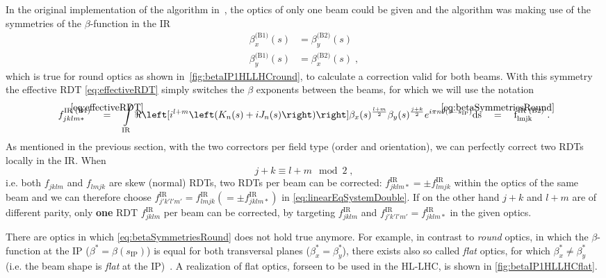 In the original implementation of the algorithm in~\cite{BruningDynamicApertureStudies2004},
the optics of only one beam could be given and the algorithm was making use 
of the symmetries of the $\beta$-function in the IR
%
\begin{equation}
    \label{eq:betaSymmetriesRound}
    \begin{split}
        \beta_x^{\text{(B1)}}(s) &= \beta_y^{\text{(B2)}}(s) \\ 
        \beta_y^{\text{(B1)}}(s) &= \beta_x^{\text{(B2)}}(s) \;, 
    \end{split}
\end{equation}
%
which is true for round optics as shown in~\cref{fig:betaIP1HLLHCround}, to calculate a correction valid for both beams.
With this symmetry the effective RDT \cref{eq:effectiveRDT} simply switches the $\beta$ exponents between the beams, 
for which we will use the notation
%
\begin{equation}
    \label{eq:effectiveRDT*}
    f^\text{IR (B1)}_{jklm*}  
    \quad \overeq{\cref{eq:effectiveRDT}} \quad
    \int\limits_\text{IR} 
    \ReOf{ 
     i^{l+m}
     \left(K_{n}(s) + iJ_{n}(s) \right) 
    }
        \beta_x(s)^{\frac{l+m}{2}}
        \beta_y(s)^{\frac{j+k}{2}} 
     e^{i \pi n \theta(s - s_\text{IP})}
    \rm{d}s 
    \quad \overeq{\cref{eq:betaSymmetriesRound}} \quad
    f^\text{IR (B2)}_{lmjk}\; .
\end{equation}
%
As mentioned in the previous section, with the two correctors per field type (order and orientation),
we can perfectly correct two RDTs locally in the IR. 
When 
%
\begin{equation}
    j+k \equiv l+m \mod{2} \;,
\end{equation}
%
i.e. both $f_{jklm}$ and $f_{lmjk}$ are skew (normal) RDTs, 
two RDTs per beam can be corrected: 
$f^\text{IR}_{jklm*} = \pm f^\text{IR}_{lmjk}$ within the optics of the same beam
and we can therefore choose $f^\text{IR}_{j'k'l'm'}  = f^\text{IR}_{lmjk} (= \pm f^\text{IR}_{jklm*})$ in \cref{eq:linearEqSystemDouble}.
If on the other hand $j+k$ and $l+m$ are of different parity, only \textbf{one} RDT $f^\text{IR}_{jklm}$ per beam can be corrected, 
by targeting $f^\text{IR}_{jklm}$ and $f^\text{IR}_{j'k'l'm'} = f^\text{IR}_{jklm*}$ in the given optics.

There are optics in which \cref{eq:betaSymmetriesRound} does not hold true anymore.
For example, in contrast to \textit{round} optics, 
in which the $\beta$-function  at the IP ($\beta^* = \beta(s_\text{IP})$) is equal for both transversal planes ($\beta^*_x = \beta^*_y$),
there exists also so called \textit{flat} optics, for which $\beta^*_x \neq \beta^*_y$ 
(i.e. the beam shape is \textit{flat} at the IP)~\cite{FartoukhAchromaticTelescopicSqueezing2013,FartoukhFlatTelescopicOptics2018}.
A realization of flat optics, forseen to be used in the HL-LHC, is shown in \cref{fig:betaIP1HLLHCflat}.


